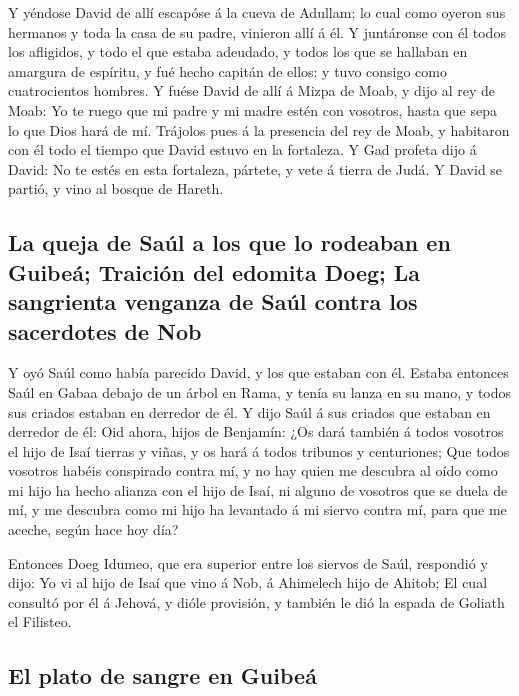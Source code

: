  Y yéndose David de allí escapóse á la cueva de Adullam; lo
cual como oyeron sus hermanos y toda la casa de su padre, vinieron allí
á él.  Y juntáronse con él todos los afligidos, y todo el
que estaba adeudado, y todos los que se hallaban en amargura de
espíritu, y fué hecho capitán de ellos: y tuvo consigo como
cuatrocientos hombres.  Y fuése David de allí á Mizpa de
Moab, y dijo al rey de Moab: Yo te ruego que mi padre y mi madre estén
con vosotros, hasta que sepa lo que Dios hará de mí. 
Trájolos pues á la presencia del rey de Moab, y habitaron con él todo el
tiempo que David estuvo en la fortaleza.  Y Gad profeta dijo
á David: No te estés en esta fortaleza, pártete, y vete á tierra de
Judá. Y David se partió, y vino al bosque de Hareth.

\hypertarget{la-queja-de-sauxfal-a-los-que-lo-rodeaban-en-guibeuxe1-traiciuxf3n-del-edomita-doeg-la-sangrienta-venganza-de-sauxfal-contra-los-sacerdotes-de-nob}{%
\subsection{La queja de Saúl a los que lo rodeaban en Guibeá; Traición
del edomita Doeg; La sangrienta venganza de Saúl contra los sacerdotes
de
Nob}\label{la-queja-de-sauxfal-a-los-que-lo-rodeaban-en-guibeuxe1-traiciuxf3n-del-edomita-doeg-la-sangrienta-venganza-de-sauxfal-contra-los-sacerdotes-de-nob}}

 Y oyó Saúl como había parecido David, y los que estaban con
él. Estaba entonces Saúl en Gabaa debajo de un árbol en Rama, y tenía su
lanza en su mano, y todos sus criados estaban en derredor de él.
 Y dijo Saúl á sus criados que estaban en derredor de él:
Oid ahora, hijos de Benjamín: ¿Os dará también á todos vosotros el hijo
de Isaí tierras y viñas, y os hará á todos tribunos y centuriones;
 Que todos vosotros habéis conspirado contra mí, y no hay
quien me descubra al oído como mi hijo ha hecho alianza con el hijo de
Isaí, ni alguno de vosotros que se duela de mí, y me descubra como mi
hijo ha levantado á mi siervo contra mí, para que me aceche, según hace
hoy día?

 Entonces Doeg Idumeo, que era superior entre los siervos de
Saúl, respondió y dijo: Yo vi al hijo de Isaí que vino á Nob, á
Ahimelech hijo de Ahitob;  El cual consultó por él á
Jehová, y dióle provisión, y también le dió la espada de Goliath el
Filisteo.

\hypertarget{el-plato-de-sangre-en-guibeuxe1}{%
\subsection{El plato de sangre en
Guibeá}\label{el-plato-de-sangre-en-guibeuxe1}}

